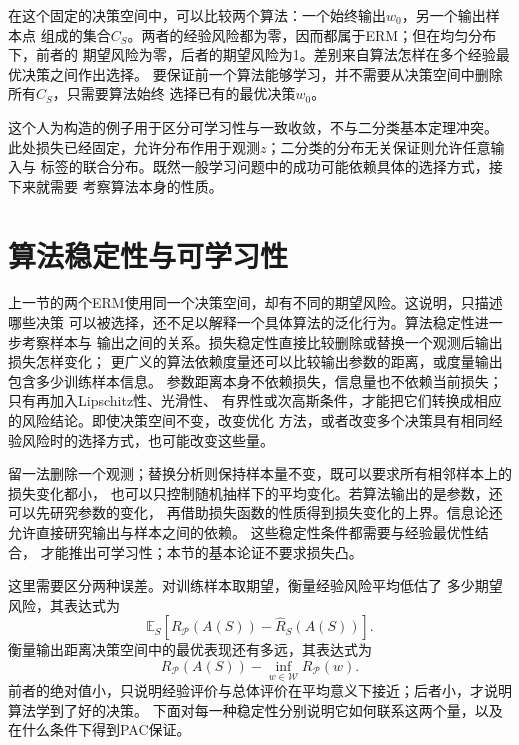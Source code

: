 在这个固定的决策空间中，可以比较两个算法：一个始终输出$w_0$，另一个输出样本点
组成的集合$C_S$。两者的经验风险都为零，因而都属于ERM；但在均匀分布下，前者的
期望风险为零，后者的期望风险为1。差别来自算法怎样在多个经验最优决策之间作出选择。
要保证前一个算法能够学习，并不需要从决策空间中删除所有$C_S$，只需要算法始终
选择已有的最优决策$w_0$。

这个人为构造的例子用于区分可学习性与一致收敛，不与二分类基本定理冲突。
此处损失已经固定，允许分布作用于观测$z$；二分类的分布无关保证则允许任意输入与
标签的联合分布。既然一般学习问题中的成功可能依赖具体的选择方式，接下来就需要
考察算法本身的性质。

\section{算法稳定性与可学习性}
\label{sec:algorithmic-stability}

上一节的两个ERM使用同一个决策空间，却有不同的期望风险。这说明，只描述哪些决策
可以被选择，还不足以解释一个具体算法的泛化行为。算法稳定性进一步考察样本与
输出之间的关系。损失稳定性直接比较删除或替换一个观测后输出损失怎样变化；
更广义的算法依赖度量还可以比较输出参数的距离，或度量输出包含多少训练样本信息。
参数距离本身不依赖损失，信息量也不依赖当前损失；只有再加入Lipschitz性、光滑性、
有界性或次高斯条件，才能把它们转换成相应的风险结论。即使决策空间不变，改变优化
方法，或者改变多个决策具有相同经验风险时的选择方式，也可能改变这些量。

留一法删除一个观测；替换分析则保持样本量不变，既可以要求所有相邻样本上的损失变化都小，
也可以只控制随机抽样下的平均变化。若算法输出的是参数，还可以先研究参数的变化，
再借助损失函数的性质得到损失变化的上界。信息论还允许直接研究输出与样本之间的依赖。
这些稳定性条件都需要与经验最优性结合，
才能推出可学习性；本节的基本论证不要求损失凸。

这里需要区分两种误差。对训练样本取期望，衡量经验风险平均低估了
多少期望风险，其表达式为
\[
 \mathbb E_S[R_{\mathcal P}(A(S))-\hat R_S(A(S))].
\]
衡量输出距离决策空间中的最优表现还有多远，其表达式为
\[
 R_{\mathcal P}(A(S))-\inf_{w\in\mathcal W}R_{\mathcal P}(w).
\]
前者的绝对值小，只说明经验评价与总体评价在平均意义下接近；后者小，才说明算法学到了好的决策。
下面对每一种稳定性分别说明它如何联系这两个量，以及在什么条件下得到PAC保证。

